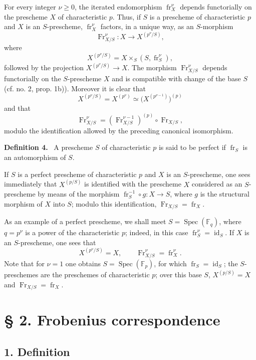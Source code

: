\documentclass[11pt]{article}
\newenvironment{statement}[1]{\par\medskip\noindent\textbf{#1.}\ }{\par\medskip}
\DeclareMathOperator{\Spec}{Spec}
\providecommand{\id}{\operatorname{id}}
\providecommand{\id}{\operatorname{id}}
\providecommand{\id}{\operatorname{id}}
\providecommand{\id}{\operatorname{id}}
\providecommand{\Spec}{\operatorname{Spec}}
\providecommand{\Spec}{\operatorname{Spec}}
\providecommand{\id}{\operatorname{id}}
\providecommand{\Spec}{\operatorname{Spec}}
\providecommand{\fr}{\operatorname{fr}}
\providecommand{\Fr}{\operatorname{Fr}}
\providecommand{\Fr}{\operatorname{Fr}}
\providecommand{\fr}{\operatorname{fr}}
\providecommand{\Spec}{\operatorname{Spec}}
\providecommand{\id}{\operatorname{id}}
\begin{document}
For every integer $\nu\geq0$, the iterated endomorphism $\fr_X^\nu$ depends functorially on the prescheme $X$ of characteristic $p$. Thus, if $S$ is a prescheme of characteristic $p$ and $X$ is an $S$-prescheme, $\fr_X^\nu$ factors, in a unique way, as an $S$-morphism
\[
\Fr_{X/S}^\nu:X\longrightarrow X^{(p^\nu/S)},
\]
where
\[
X^{(p^\nu/S)}=X\times_S(S,\fr_S^\nu),
\]
followed by the projection $X^{(p^\nu/S)}\to X$. The morphism $\Fr_{X/S}^\nu$ depends functorially on the $S$-prescheme $X$ and is compatible with change of the base $S$ (cf. no. 2, prop. 1b)). Moreover it is clear that
\[
X^{(p^\nu/S)}=X^{(p^\nu)}\simeq\bigl(X^{(p^{\nu-1})}\bigr)^{(p)}
\]
and that
\[
\Fr_{X/S}^\nu=(\Fr_{X/S}^{\nu-1})^{(p)}\circ\Fr_{X/S},
\]
modulo the identification allowed by the preceding canonical isomorphism.

\label{sga5:XV:definition:4}\begin{statement}{Definition 4}
A prescheme $S$ of characteristic $p$ is said to be perfect if $\fr_S$ is an automorphism of $S$.
\end{statement}

If $S$ is a perfect prescheme of characteristic $p$ and $X$ is an $S$-prescheme, one sees immediately that $X^{(p/S)}$ is identified with the prescheme $X$ considered as an $S$-prescheme by means of the morphism $\fr_S^{-1}\circ g:X\to S$, where $g$ is the structural morphism of $X$ into $S$; modulo this identification, $\Fr_{X/S}=\fr_X$.

As an example of a perfect prescheme, we shall meet $S=\Spec(\mathbb F_q)$, where $q=p^\nu$ is a power of the characteristic $p$; indeed, in this case $\fr_S^\nu=\id_S$. If $X$ is an $S$-prescheme, one sees that
\[
X^{(p^\nu/S)}=X,
\qquad
\Fr_{X/S}^\nu=\fr_X^\nu.
\]
Note that for $\nu=1$ one obtains $S=\Spec(\mathbb F_p)$, for which $\fr_S=\id_S$; the $S$-preschemes are the preschemes of characteristic $p$; over this base $S$, $X^{(p/S)}=X$ and $\Fr_{X/S}=\fr_X$.

\section*{§ 2. Frobenius correspondence}

\subsection*{1. Definition}\label{sga5:XV:subsection:1}
\end{document}

